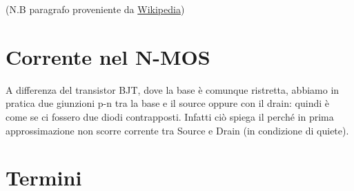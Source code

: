 \documentclass[
]{book}
\begin{document}
(N.B paragrafo proveniente da
\href{https://it.wikipedia.org/wiki/Struttura_elettronica_a_bande}{Wikipedia})

\section{Corrente nel N-MOS}\label{corrente-nel-n-mos}

A differenza del transistor BJT, dove la base è comunque ristretta,
abbiamo in pratica due giunzioni p-n tra la base e il source oppure con
il drain: quindi è come se ci fossero due diodi contrapposti. Infatti
ciò spiega il perché in prima approssimazione non scorre corrente tra
Source e Drain (in condizione di quiete).

\section{Termini}\label{termini}
\end{document}
